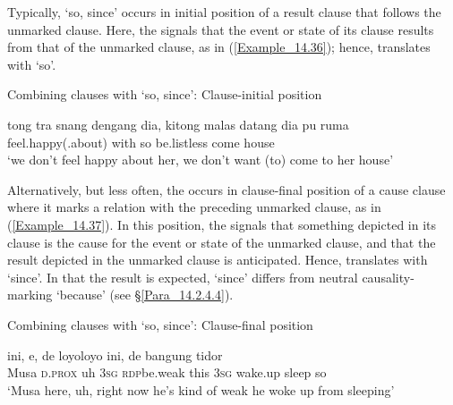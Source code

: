 Typically,  ‘so, since’ occurs in initial position of a result clause that follows the unmarked clause. Here, the  signals that the event or state of its clause results from that of the unmarked clause, as in (\ref{Example_14.36}); hence,  translates with ‘so’.
%

\begin{styleExampleTitle}
Combining clauses with  ‘so, since’: Clause-initial position
\end{styleExampleTitle}
\ea
\label{Example_14.36}
\gll       tong  tra  snang  dengang  dia,    kitong  malas   datang  dia  pu  ruma\\  
    feel.happy(.about)  with    so    be.listless   come      house\\
\glt ‘we don’t feel happy about her,  we don’t want (to) come to her house’ \textstyleExampleSource{[080927-006-CvNP.0032]}
\z

Alternatively, but less often, the  occurs in clause-final position of a cause clause where it marks a  relation with the preceding unmarked clause, as in (\ref{Example_14.37}). In this position, the  signals that something depicted in its clause is the cause for the event or state of the unmarked clause, and that the result depicted in the unmarked clause is anticipated. Hence,  translates with ‘since’. In that the result is expected,   ‘since’ differs from neutral causality-marking  ‘because’ (see §\ref{Para_14.2.4.4}).

\begin{styleExampleTitle}
Combining clauses with  ‘so, since’: Clause-final position
\end{styleExampleTitle}
\ea
\label{Example_14.37}
 {ini,} {e,} {de} {loyo{\Tilde}loyo} {ini,} {de} {bangung} {tidor} {}\\ %
 Musa  \textsc{d.prox}  uh  \textsc{3sg}  \textsc{rdp}{\Tilde}be.weak  this  \textsc{3sg}  wake.up  sleep so\\
 ‘Musa here, uh, right now he’s kind of weak  he woke up from sleeping’ \textstyleExampleSource{[080922-001a-CvPh.1435/1437]}
\z

